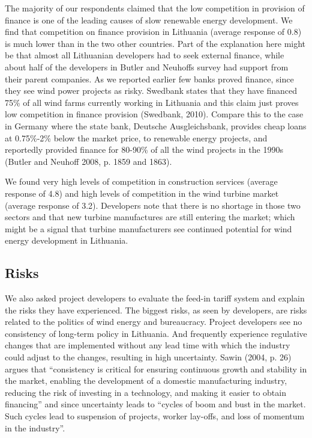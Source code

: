 \documentclass[a4paper, 12pt]{article}
\begin{document}
The majority of our respondents claimed that the low competition in provision of finance is one of the leading causes of slow renewable energy development. We find that competition on finance provision in Lithuania (average response of 0.8) is much lower than in the two other countries. Part of the explanation here might be that almost all Lithuanian developers had to seek external finance, while about half of the developers in Butler and Neuhoffs survey had support from their parent companies. As we reported earlier few banks proved finance, since they see wind power projects as risky. Swedbank states that they have financed 75\% of all wind farms currently working in Lithuania and this claim just proves low competition in finance provision (Swedbank, 2010). Compare this to the case in Germany where the state bank, Deutsche Ausgleichsbank, provides cheap loans at 0.75\%-2\% below the market price, to renewable energy projects, and reportedly provided finance for 80-90\% of all the wind projects in the 1990s (Butler and Neuhoff 2008, p. 1859 and 1863).

We found very high levels of competition in construction services (average response of 4.8) and high levels of competition in the wind turbine market (average response of 3.2). Developers note that there is no shortage in those two sectors and that new turbine manufactures are still entering the market; which might be a signal that turbine manufacturers see continued potential for wind energy development in Lithuania. 

\subsection{Risks}
We also asked project developers to evaluate the feed-in tariff system and explain the risks they have experienced. The biggest risks, as seen by developers, are risks related to the politics of wind energy and bureaucracy. Project developers see no consistency of long-term policy in Lithuania. And frequently experience regulative changes that are implemented without any lead time with which the industry could adjust to the changes, resulting in high uncertainty. Sawin (2004, p. 26) argues that ``consistency is critical for ensuring continuous growth and stability in the market, enabling the development of a domestic manufacturing industry, reducing the risk of investing in a technology, and making it easier to obtain financing'' and since uncertainty leads to ``cycles of boom and bust in the market. Such cycles lead to suspension of projects, worker lay-offs, and loss of momentum in the industry''.
\end{document}

